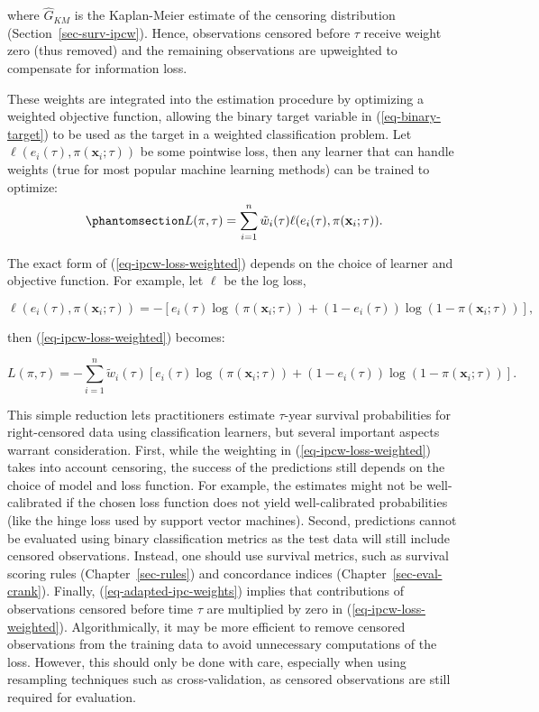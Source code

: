 \documentclass[
  letterpaper,
  krantz2]{style/krantz}
\begin{document}
where \(\hat{G}_{KM}\) is the Kaplan-Meier estimate of the censoring
distribution (Section~\ref{sec-surv-ipcw}). Hence, observations censored
before \(\tau\) receive weight zero (thus removed) and the remaining
observations are upweighted to compensate for information loss.

These weights are integrated into the estimation procedure by optimizing
a weighted objective function, allowing the binary target variable in
(\ref{eq-binary-target}) to be used as the target in a weighted
classification problem. Let \(\ell(e_i(\tau), \pi(\mathbf{x}_i;\tau))\)
be some pointwise loss, then any learner that can handle weights (true
for most popular machine learning methods) can be trained to optimize:
\begin{equation}\phantomsection\label{eq-ipcw-loss-weighted}{
L(\pi,\tau) = \sum_{i=1}^n \tilde{w}_i(\tau) \ell(e_i(\tau), \pi(\mathbf{x}_i;\tau)).
}\end{equation}

The exact form of (\ref{eq-ipcw-loss-weighted}) depends on the choice of
learner and objective function. For example, let \(\ell\) be the log
loss,

\[
\ell(e_i(\tau), \pi(\mathbf{x}_i;\tau)) = -\left[e_i(\tau)\log(\pi(\mathbf{x}_i;\tau)) + (1-e_i(\tau))\log(1 - \pi(\mathbf{x}_i;\tau))\right],
\]

then (\ref{eq-ipcw-loss-weighted}) becomes:

\[
L(\pi,\tau) = -\sum_{i=1}^n \tilde{w}_i(\tau) \left[e_i(\tau)\log(\pi(\mathbf{x}_i;\tau)) + (1-e_i(\tau))\log(1 - \pi(\mathbf{x}_i;\tau))\right].
\]

This simple reduction lets practitioners estimate \(\tau\)-year survival
probabilities
for right-censored data using classification learners, but several
important aspects warrant consideration. First, while the weighting in
(\ref{eq-ipcw-loss-weighted}) takes into account censoring, the success
of the predictions still depends on the choice of model and loss
function. For example, the estimates might not be well-calibrated if the
chosen loss function does not yield well-calibrated probabilities (like
the hinge loss used by support vector machines). Second, predictions
cannot be evaluated using binary classification metrics as the test data
will still include censored observations. Instead, one should use
survival metrics, such as survival scoring rules
(Chapter~\ref{sec-rules}) and concordance
indices (Chapter~\ref{sec-eval-crank}).
Finally, (\ref{eq-adapted-ipc-weights}) implies that contributions of
observations censored before time \(\tau\) are multiplied by zero in
(\ref{eq-ipcw-loss-weighted}). Algorithmically, it may be more efficient
to remove censored observations from the training data to avoid
unnecessary computations of the loss. However, this should only be done
with care, especially when using resampling techniques such as
cross-validation, as censored observations are still required for
evaluation.
\end{document}
